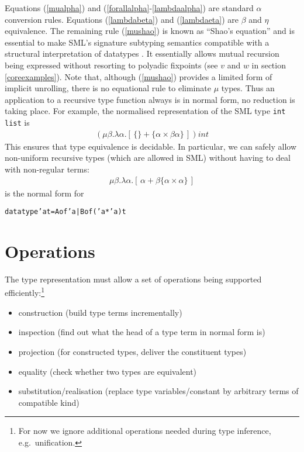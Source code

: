 \documentclass[twoside]{article}
\newcommand{\x}[1]{\mathit{#1}}
\begin{document}
Equations (\ref{mualpha}) and (\ref{forallalpha}-\ref{lambdaalpha}) are standard $\alpha$ conversion rules. Equations (\ref{lambdabeta}) and (\ref{lambdaeta}) are $\beta$ and $\eta$ equivalence. The remaining rule (\ref{mushao}) is known as ``Shao's equation'' and is essential to make SML's signature subtyping semantics compatible with a structural interpretation of datatypes \cite{datatypes}. It essentially allows mutual recursion being expressed without resorting to polyadic fixpoints (see $v$ and $w$ in section \ref{coreexamples}). Note that, although (\ref{mushao}) provides a limited form of implicit unrolling, there is no equational rule to eliminate $\mu$ types. Thus an application to a recursive type function always is in normal form, no reduction is taking place. For example, the normalised representation of the SML type {\tt int} {\tt list} is
\begin{eqnarray*}
(\mu\beta . \lambda\alpha . [\,\{\} + \{\alpha \times \beta\alpha\}\,])\x{int}
\end{eqnarray*}
This ensures that type equivalence is decidable. In particular, we can safely allow non-uniform recursive types (which are allowed in SML) without having to deal with non-regular terms:
\begin{eqnarray*}
\mu\beta . \lambda\alpha . [\,\alpha + \beta\{\alpha \times \alpha\}\,]
\end{eqnarray*}
is the normal form for
\begin{alltt}
datatype 'a t = A of 'a | B of ('a * 'a) t
\end{alltt}


\section{Operations}
\label{coreoperations}

The type representation must allow a set of operations being supported efficiently:\footnote{For now we ignore additional operations needed during type inference, e.g.\ unification.}

\begin{itemize}
\item construction (build type terms incrementally)
\item inspection (find out what the head of a type term in normal form is)
\item projection (for constructed types, deliver the constituent types)
\item equality (check whether two types are equivalent)
\item substitution/realisation (replace type variables/constant by arbitrary terms of compatible kind)
\end{itemize}
\end{document}
